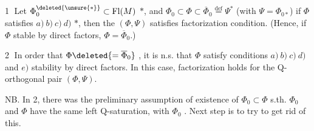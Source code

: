 \textcircled{1}  Let $\Phi_0^{\deleted{\unsure{*}}}\subset\mathrm{Fl}(M)$ $*$, and $\Phi_0\subset\Phi\subset\overline\Phi_0\stackrel{\mathrm{def}}=\Psi^*$ (with $\Psi=\Phi_{0*}$)
if $\Phi$  satisfies $a)\ b)\ c)\ d)$ $*$, then the $(\Phi,\Psi)$ satisfies factorization condition. (Hence, if $\Phi$ stable by direct factors, $\Phi=\overline\Phi_0$.)

\textcircled{2}  In order that $\Phi\deleted{=\overline\Phi_0}$ , it is n.s. that $\Phi$ satisfy conditions $a)\ b)\ c)\ d)$ and $e)$ stability by direct factors. In this case, factorization holds for the Q-orthogonal pair $(\Phi,\Psi)$.

NB. In 2,  there was the preliminary assumption of existence of $\Phi_0\subset\Phi$ s.th. $\Phi_0$ and $\Phi$ have the same left Q-saturation, with $\Phi_0$ . Next step is to try to get rid of this.

